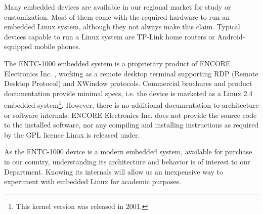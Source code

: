 \documentclass[conference]{IEEEtran}
\newcommand{\nota}[1]{}
\begin{document}
\nota{Existen decenas de dispositivos embebidos en el mercado regional,
que pueden adquirirse para su estudio y adaptación. Y,
aunque muchas veces no se encuentren visiblemente etiquetados o documentados,
gran parte de estos sistemas contienen el hardware necesario
para ejecutar un sistema operativo Linux embebido. Ejemplos de estos dispositivos
capaces de ejecutar un sistema Linux son los routers hogareños TP-Link,
y los teléfonos móviles con sistema Android.
}
Many embedded devices are available in our regional market for study or customization. Most of them come with the required hardware to run an embedded Linux system, although they not always make this claim. Typical devices capable to run a Linux system are TP-Link home routers or Android-equipped mobile phones.

\nota{
El sistema embebido ENTC-1000 es un producto propietario de ENCORE Electronics Inc \cite{encore},
que funciona como una terminal de escritorio remoto, soportando
los protocolos RDP (Remote-Desktop-Protocol) y Xwindow. Si bien el folleto
comercial y su documentación proveen especificaciones mínimas,
esto es, se publicita como un sistema con Linux embebido kernel 2.4 
\footnote{Año 2001}, no existe información adicional de la arquitectura o funcionamiento
interno del software. Tampoco provee, ENCORE Electronic Inc.,
el código fuente del software instalado, ni las instrucciones
para su compilación e instalación (como es requerido por la licencia GPL de Linux \cite{gpl}).
}

The ENTC-1000 embedded system is a proprietary product of ENCORE Electronics Inc. \cite{encore},
working as a remote desktop terminal supporting RDP (Remote Desktop Protocol) and XWindow protocols. Commercial brochures and product documentation provide minimal specs, i.e. the device is marketed as a Linux 2.4 embedded system\footnote{This kernel version was released in 2001.}. However, there is no additional documentation to architecture or software internals. ENCORE Electronics Inc. does not provide the source code to the installed software, nor any compiling and installing instructions as required by the GPL licence Linux is released under\cite{gpl}.

\nota{Es de interés para nuestra facultad el entendimiento de la arquitectura y funcionamiento
de los dispositivos ENTC-1000,
ya que se trata de un sistema embebido moderno, y disponible
para su adquisición en el país. Conocer su funcionamiento interno
nos permite la experimentación académica con Linux embebido. Y,
por último, pero no menos importante, permite su reuso para necesidades
específicas en el marco de los sistemas embebidos.
}
As the ENTC-1000 device is a modern embedded system, available for purchase in our country, understanding its architecture and behavior is of interest to our Department.  Knowing its internals will allow us an inexpensive way to experiment with embedded Linux for academic purposes. 
\end{document}
